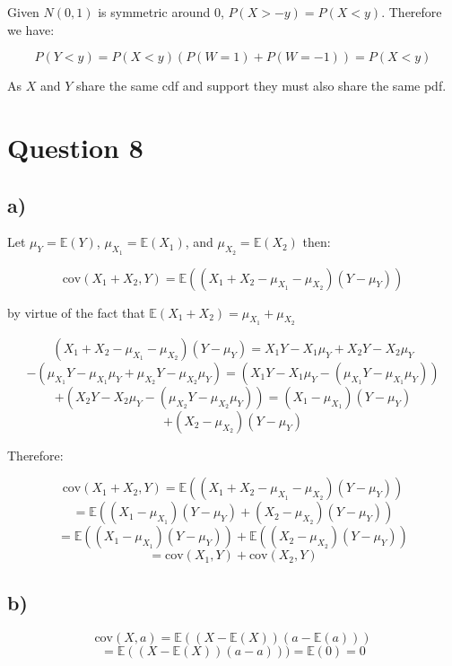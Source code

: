 \documentclass[11pt]{article}
\begin{document}
Given $N(0,1)$ is symmetric around $0$, $P(X>-y) = P(X<y)$. Therefore we have:

$$P(Y<y)=P(X<y)\left(P(W=1) + P(W=-1)\right)=P(X<y)$$

As $X$ and $Y$ share the same cdf and support they must also share the same pdf. 

\section*{Question 8}

\subsection*{a)}

Let $\mu_Y = \mathbb{E}(Y)$, $\mu_{X_1} = \mathbb{E}(X_1)$, and $\mu_{X_2}=\mathbb{E}(X_2)$ then:

$$\text{cov}(X_1 + X_2, Y) = \mathbb{E}\left((X_1 + X_2 - \mu_{X_1} - \mu_{X_2})(Y - \mu_Y)\right)$$

by virtue of the fact that $\mathbb{E}(X_1 + X_2) = \mu_{X_1} + \mu_{X_2}$ 

$$(X_1 + X_2 - \mu_{X_1} - \mu_{X_2})(Y - \mu_Y) = X_1Y -X_1\mu_Y + X_2Y - X_2\mu_Y $$
$$- ( \mu_{X_1}Y -\mu_{X_1}\mu_Y + \mu_{X_2}Y - \mu_{X_2}\mu_Y)=(X_1Y -X_1\mu_Y - (\mu_{X_1}Y -\mu_{X_1}\mu_Y)) $$
$$+(X_2Y - X_2\mu_Y- (\mu_{X_2}Y - \mu_{X_2}\mu_Y))=(X_1-\mu_{X_1})(Y- \mu_Y)$$
$$+(X_2-\mu_{X_2})(Y- \mu_Y)$$

Therefore:

$$\text{cov}(X_1 + X_2, Y) = \mathbb{E}\left((X_1 + X_2 - \mu_{X_1} - \mu_{X_2})(Y - \mu_Y)\right)$$
$$=\mathbb{E}\left((X_1-\mu_{X_1})(Y- \mu_Y)+(X_2-\mu_{X_2})(Y- \mu_Y)\right)$$
$$=\mathbb{E}((X_1-\mu_{X_1})(Y- \mu_Y)) + \mathbb{E}((X_2-\mu_{X_2})(Y- \mu_Y))$$
$$=\text{cov}(X_1, Y) + \text{cov}(X_2, Y)$$

\subsection*{b)}

$$\text{cov}(X, a) = \mathbb{E}((X-\mathbb{E}(X))(a-\mathbb{E}(a)))$$
$$=\mathbb{E}((X-\mathbb{E}(X))(a-a)))= \mathbb{E}(0)=0$$
\end{document}
